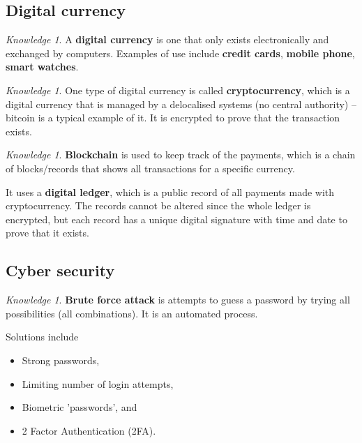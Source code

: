 \documentclass[8pt]{article}
\theoremstyle{remark}
\newtheorem{knowledge}[method]{Knowledge}
\begin{document}
        \subsection{Digital currency}
            \begin{knowledge}
                A \textbf{digital currency} is one that only exists electronically and exchanged by computers. Examples of use include \textbf{credit cards}, \textbf{mobile phone}, \textbf{smart watches}.
            \end{knowledge}

            \begin{knowledge}
                One type of digital currency is called \textbf{cryptocurrency}, which is a digital currency that is managed by a delocalised systems (no central authority) -- bitcoin is a typical example of it. It is encrypted to prove that the transaction exists.
            \end{knowledge}

            \begin{knowledge}
                \textbf{Blockchain} is used to keep track of the payments, which is a chain of blocks/records that shows all transactions for a specific currency.
                
                It uses a \textbf{digital ledger}, which is a public record of all payments made with cryptocurrency. The records cannot be altered since the whole ledger is encrypted, but each record has a unique digital signature with time and date to prove that it exists.
            \end{knowledge}

        \subsection{Cyber security}
            \begin{knowledge}
                \textbf{Brute force attack} is attempts to guess a password by trying all possibilities (all combinations). It is an automated process.

                Solutions include
                \begin{itemize}
                    \item Strong passwords,
                    \item Limiting number of login attempts,
                    \item Biometric 'passwords', and
                    \item 2 Factor Authentication (2FA).
                \end{itemize}
            \end{knowledge}
\end{document}
